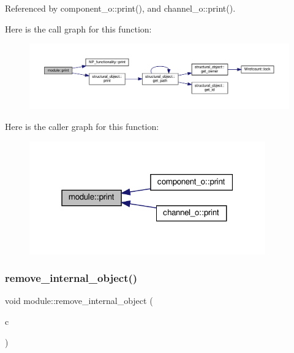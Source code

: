 Referenced by component\+\_\+o\+::print(), and channel\+\_\+o\+::print().

Here is the call graph for this function\+:
\nopagebreak
\begin{figure}[H]
\begin{center}
\leavevmode
\includegraphics[width=350pt]{d0/dd3/classmodule_a91f3995762c61b4bc46bd0520d72dc0a_cgraph}
\end{center}
\end{figure}
Here is the caller graph for this function\+:
\nopagebreak
\begin{figure}[H]
\begin{center}
\leavevmode
\includegraphics[width=289pt]{d0/dd3/classmodule_a91f3995762c61b4bc46bd0520d72dc0a_icgraph}
\end{center}
\end{figure}
\mbox{\label{classmodule_aed03c64400a4ccff10f43e117e21c923}} 
\subsubsection{\texorpdfstring{remove\+\_\+internal\+\_\+object()}{remove\_internal\_object()}}
{\footnotesize\ttfamily void module\+::remove\+\_\+internal\+\_\+object (\begin{DoxyParamCaption}\item[{\hyperlink{structural__objects_8hpp_a8ea5f8cc50ab8f4c31e2751074ff60b2}{structural\+\_\+object\+Ref}}]{c }\end{DoxyParamCaption})}



